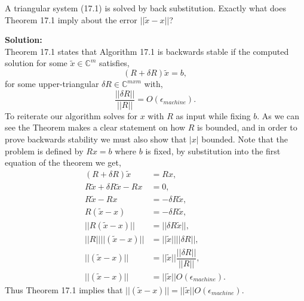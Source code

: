 \documentclass[12pt]{article}
\makeatletter
\theoremstyle{homework}
\newenvironment{exercise}[1]
{\def\@currentlabel{#1}\exercisecore}
{\endexercisecore}
\newcommand{\localhead}[1]{\par\smallskip\noindent\textbf{#1}\nobreak\\}%
\newcommand\solution{\localhead{Solution:}}
\newcommand{\Cplx}{\ensuremath{\mathbb C}}
\newcommand{\emach}{\ensuremath{\epsilon_{machine}}}
\let\CC\Cplx
\makeatother
\begin{document}
\vspace{1in}



\begin{exercise}{17.2} A triangular system (17.1) is solved by back substitution. Exactly what does Theorem 17.1 imply about the error $||\tilde{x} - x||$?\\
  \solution Theorem 17.1 states that Algorithm 17.1 is backwards stable if the computed solution for some $\tilde{x} \in \CC^m$ satisfies, 
  \begin{equation*}
    (R + \delta R)\tilde{x} = b,
  \end{equation*}
  for some upper-triangular $\delta R \in \CC^{mxm}$ with, 
  \begin{equation*}
    \dfrac{||\delta R||}{||R||} = O(\emach).
  \end{equation*}
  To reiterate our algorithm solves for $x$ with $R$ as input while fixing $b$. As we can see the Theorem makes a clear statement on how $R$ is bounded, and 
  in order to prove backwards stability we must also show that $|x|$ bounded. Note that the problem is defined by $Rx = b$ where $b$ is fixed, by substitution 
  into the first equation of the theorem we get, 
  \begin{align*}
    (R + \delta R)\tilde{x} &= Rx, \\
    R\tilde{x} + \delta R\tilde{x} - Rx &= 0, \\
    R\tilde{x} - Rx &= -\delta R\tilde{x}, \\
    R(\tilde{x} - x) &= -\delta R\tilde{x}, \\
    ||R(\tilde{x} - x)|| &= ||\delta R\tilde{x}||, \\
    ||R|| ||(\tilde{x} - x)|| &= ||\tilde{x}||||\delta R||, \\
    ||(\tilde{x} - x)|| &= ||\tilde{x}||\dfrac{||\delta R||}{||R||}, \\
    ||(\tilde{x} - x)|| &= ||\tilde{x}||O(\emach). 
  \end{align*}
  Thus Theorem 17.1 implies that $||(\tilde{x} - x)|| = ||\tilde{x}||O(\emach)$.
  
\end{exercise}
\end{document}
